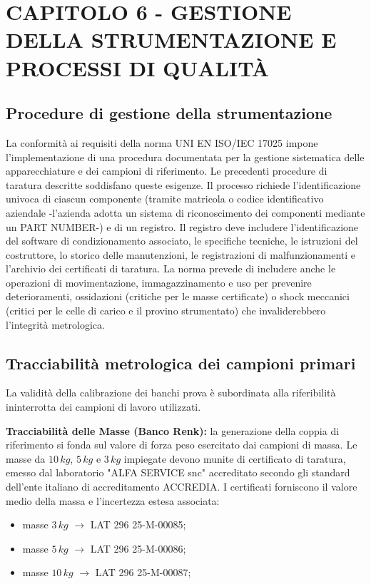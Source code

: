 \documentclass[a4paper, twoside]{article}
\begin{document}

    \newpage

\section{CAPITOLO 6 - GESTIONE DELLA STRUMENTAZIONE E PROCESSI DI QUALITÀ}

\subsection{Procedure di gestione della strumentazione}

La conformità ai requisiti della norma UNI EN ISO/IEC 17025 impone l'implementazione di una procedura documentata per la gestione sistematica delle apparecchiature e dei campioni di riferimento. Le precedenti procedure di taratura descritte soddisfano queste esigenze. Il processo richiede l'identificazione univoca di ciascun componente (tramite matricola o codice identificativo aziendale -l'azienda adotta un sistema di riconoscimento dei componenti mediante un PART NUMBER-) e di un registro. Il registro deve includere l'identificazione del software di condizionamento associato, le specifiche tecniche, le istruzioni del costruttore, lo storico delle manutenzioni, le registrazioni di malfunzionamenti e l'archivio dei certificati di taratura. La norma prevede di includere anche le operazioni di movimentazione, immagazzinamento e uso per prevenire deterioramenti, ossidazioni (critiche per le masse certificate) o shock meccanici (critici per le celle di carico e il provino strumentato) che invaliderebbero l'integrità metrologica.

\subsection{Tracciabilità metrologica dei campioni primari} 

La validità della calibrazione dei banchi prova è subordinata alla riferibilità ininterrotta dei campioni di lavoro utilizzati. 

\textbf{Tracciabilità delle Masse (Banco Renk):} la generazione della coppia di riferimento si fonda sul valore di forza peso esercitato dai campioni di massa. Le masse da $10\,kg$, $5\,kg$ e $3\,kg$ impiegate devono munite di certificato di taratura, emesso dal laboratorio "ALFA SERVICE snc" accreditato secondo gli standard dell'ente italiano di accreditamento ACCREDIA. I certificati forniscono il valore medio della massa e l'incertezza estesa associata:
\begin{itemize}
    \item masse $3\,kg$ $\rightarrow$ LAT 296 25-M-00085;
    \item masse $5\,kg$ $\rightarrow$ LAT 296 25-M-00086;
    \item masse $10\,kg$ $\rightarrow$ LAT 296 25-M-00087;
\end{itemize}
\end{document}

